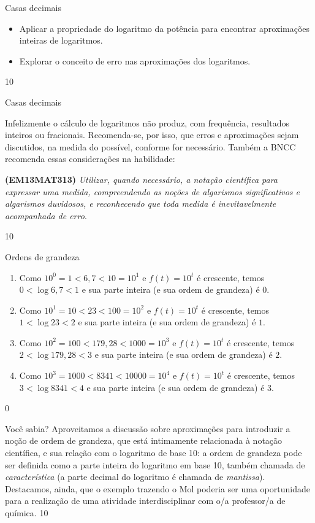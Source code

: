 \clearmargin
\begin{objectives}{Casas decimais}
{
	\begin{itemize}
	\item Aplicar a propriedade do logaritmo da potência para encontrar aproximações inteiras de logaritmos.
	\item Explorar o conceito de erro nas aproximações dos logaritmos.
	\end{itemize}
}{1}{0}
\end{objectives}
\begin{sugestions}{Casas decimais}
{
	Infelizmente o cálculo de logaritmos não produz, com frequência, resultados inteiros ou fracionais. Recomenda-se, por isso, que erros e aproximações sejam discutidos, na medida do possível, conforme for necessário. Também a BNCC recomenda essas considerações na habilidade:

	\textbf{(EM13MAT313)} \textit{Utilizar, quando necessário, a notação científica para expressar uma medida, compreendendo as noções de algarismos significativos e algarismos duvidosos, e reconhecendo que toda medida é inevitavelmente acompanhada de erro}.
}{1}{0}
\end{sugestions}
\begin{answer}{Ordens de grandeza}
{
	\begin{enumerate}
	\item Como $10^0=1 < 6{,}7 <10 =10^1$ e $f(t)=10^t$ é crescente, temos $0 < \log 6{,}7 < 1$ e sua parte inteira (e sua ordem de grandeza) é $0$.
	\item Como $10^1=10 < 23 <100 =10^2$ e $f(t)=10^t$ é crescente, temos $1 < \log 23 < 2$ e sua parte inteira (e sua ordem de grandeza) é $1$.
	\item Como $10^2=100 < 179{,}28 <1000 =10^3$ e $f(t)=10^t$ é crescente, temos $2 < \log 179{,}28 < 3$ e sua parte inteira (e sua ordem de grandeza) é $2$.
	\item Como $10^3=1000 < 8341 <10000 =10^4$ e $f(t)=10^t$ é crescente, temos $3 < \log 8341 < 4$ e sua parte inteira (e sua ordem de grandeza) é $3$.
	\end{enumerate}
	}{0}
\end{answer}
\begin{sugestions}{Você sabia?}
{
	Aproveitamos a discussão sobre aproximações para introduzir a noção de ordem de grandeza, que está intimamente relacionada à notação científica, e sua relação com o logaritmo de base 10: a ordem de grandeza pode ser definida como a parte inteira do logaritmo em base 10, também chamada de \textit{característica} (a parte decimal do logaritmo é chamada de \textit{mantissa}). Destacamos, ainda, que o exemplo trazendo o Mol poderia ser uma oportunidade para a realização de uma atividade interdisciplinar com o/a professor/a de química.
}{1}{0}
\end{sugestions}
